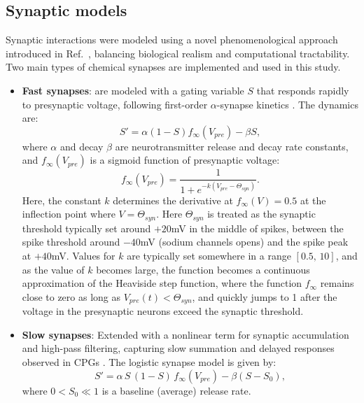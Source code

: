\documentclass[nofootinbib,aip,amsmath,amssymb,reprint,twocolumn,10pt]{revtex4-2}
\begin{document}
\subsection{Synaptic models}

Synaptic interactions were modeled using a novel phenomenological approach introduced in  Ref.~\cite{scully2024pairing}, balancing biological realism and computational tractability. Two main types of chemical synapses are implemented and used in this study. 
\begin{itemize}
  \item \textbf{Fast synapses}: are modeled with a gating variable $S$ that responds rapidly to presynaptic voltage, following first-order $\alpha$-synapse kinetics \cite{destexhe1994synthesis, Wang-Rinzel-92, Rall67}. The dynamics are:
  \begin{equation}
    S' = \alpha (1-S) f_{\infty}(V_{pre}) - \beta S,
  \end{equation}
  where  $\alpha$ and decay $\beta$ are neurotransmitter release and decay rate constants, and $f_{\infty}(V_{pre})$ is a sigmoid function of presynaptic voltage:
\begin{equation}
f_{\infty}(V_{pre}) = \frac{1}{1+e^{-k(V_{pre}-\Theta_{syn})}}.  \label{finf}
\end{equation}
Here, the constant $k$ determines the derivative at $f_{\infty}(V) = 0.5$ at the inflection point where $V=\Theta_{syn}$. Here $\Theta_{syn}$ is treated as the synaptic threshold typically set around $+20$mV in the middle of spikes, between the spike threshold around $-40$mV (sodium channels opens) and the spike peak at $+40$mV. Values for $k$ are typically set somewhere in a range $\left[0.5,\, 10\right]$, and as the value of $k$ becomes large,  the function becomes a continuous approximation of the Heaviside step function, where the function $f_\infty$ remains close to zero as long as $V_{pre}(t) < \Theta_{syn}$, and quickly jumps to 1 after the voltage in the presynaptic neurons exceed the synaptic threshold.

  
  
  \item \textbf{Slow synapses}: Extended with a nonlinear term for synaptic accumulation and high-pass filtering, capturing slow summation and delayed responses observed in CPGs \cite{NW02, WNT02, TW05, SNLK11}. The logistic synapse model is given by:
  \begin{equation}
    S' = \alpha\, S\,(1-S)\, f_{\infty}(V_{pre}) - \beta (S-S_0),
  \end{equation}
  where $0<S_0 \ll 1$ is a baseline (average) release rate.
\end{itemize}
\end{document}

